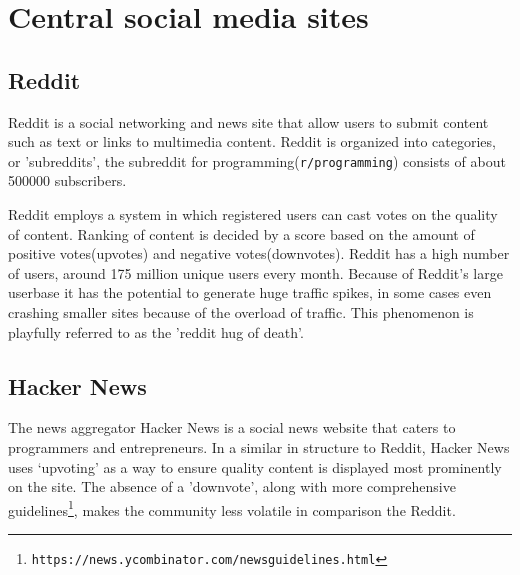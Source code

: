 \documentclass[a4paper,11pt]{article} %
\begin{document}
\section{Central social media sites}

\subsection{Reddit}

Reddit is a social networking and news site that allow users to submit
content such as text or links to multimedia content. Reddit is organized
into categories, or 'subreddits', the subreddit for
programming(\texttt{r/programming}) consists of about \num{500000}
subscribers.

Reddit employs a system in which registered users can cast votes on the
quality of content. Ranking of content is decided by a score based on the
amount of positive votes(upvotes) and negative votes(downvotes). Reddit has
a high number of users, around 175 million unique users every month. Because
of Reddit's large userbase it has the potential to generate huge traffic
spikes, in some cases even crashing smaller sites because of the overload of
traffic. This phenomenon is playfully referred to as the 'reddit hug of
death’.


\subsection{Hacker News}
The news aggregator Hacker News is a social news website that caters to
programmers and entrepreneurs. In a similar in structure to Reddit, Hacker
News uses ‘upvoting’ as a way to ensure quality content is displayed most
prominently on the site. The absence of a 'downvote', along with more
comprehensive
guidelines\footnote{\texttt{https://news.ycombinator.com/newsguidelines.html}},
makes the community less volatile in comparison the Reddit.
\end{document}

